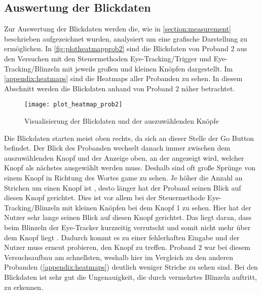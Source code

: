 \subsection{Auswertung der Blickdaten}
Zur Auswertung der Blickdaten werden die, wie in \autoref{section:measurement} beschrieben aufgezeichnet wurden, analysiert  um eine grafische Darstellung zu ermöglichen. In \autoref{fig:plotheatmapprob2} sind die Blickdaten von Proband 2 aus den Versuchen mit den Steuermethoden Eye-Tracking/Trigger und Eye-Tracking/Blinzeln mit jeweils großen und kleinen Knöpfen dargestellt. Im \autoref{appendix:heatmaps} sind die Heatmaps aller Probanden zu sehen. In diesem Abschnitt werden die Blickdaten anhand von Proband 2 näher betrachtet.  
\begin{figure}[!htbp]
	\centering
	\texttt{[image: plot\_heatmap\_prob2]}
	\caption[Visualisierung der Blickdaten und der auszuwählenden Knöpfe] {Visualisierung der Blickdaten und der auszuwählenden Knöpfe}
	\label{fig:plotheatmapprob2}
\end{figure}

Die Blickdaten starten meist  oben rechts, da sich an dieser Stelle der Go Button befindet. Der Blick des Probanden wechselt danach immer  zwischen dem auszuwählenden Knopf und der Anzeige oben, an der angezeigt wird, welcher Knopf als nächstes ausgewählt werden muss. Deshalb sind oft große Sprünge von einem Knopf in Richtung des Wortes \grqq game\grqq{} zu sehen. Je höher die Anzahl an Strichen um einen Knopf ist , desto länger hat der Proband seinen Blick auf diesen Knopf gerichtet. Dies ist vor allem bei der Steuermethode Eye-Tracking/Blinzeln mit kleinen Knöpfen bei dem Knopf 1 zu sehen. Hier hat der Nutzer sehr lange seinen Blick auf diesen Knopf gerichtet. Das liegt daran, dass beim Blinzeln der Eye-Tracker kurzzeitig verrutscht und somit nicht mehr über dem Knopf liegt . Dadurch kommt es zu einer fehlerhaften Eingabe und der Nutzer muss erneut probieren, den Knopf zu treffen. Proband 2 war bei diesem Versuchsaufbau am schnellsten, weshalb hier im Vergleich zu den anderen Probanden (\autoref{appendix:heatmaps}) deutlich weniger Striche zu sehen sind. Bei den Blickdaten ist sehr gut die Ungenauigkeit, die durch vermehrtes Blinzeln auftritt, zu erkennen. 

